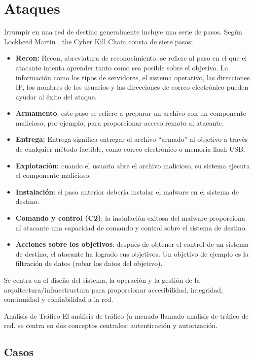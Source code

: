\section{Ataques}

Irrumpir en una red de destino generalmente incluye una serie de pasos. Según Lockheed Martin , the Cyber Kill Chain consta de siete pasos: 
\begin{itemize}
    \item \textbf{Recon:} Recon, abreviatura de reconocimiento, se refiere al paso en el que el atacante intenta aprender tanto como sea posible sobre el objetivo. La información como los tipos de servidores, el sistema operativo, las direcciones IP, los nombres de los usuarios y las direcciones de correo electrónico pueden ayudar al éxito del ataque. 
    \item \textbf{Armamento}: este paso se refiere a preparar un archivo con un componente malicioso, por ejemplo, para proporcionar acceso remoto al atacante. \item \textbf{Entrega:} Entrega significa entregar el archivo ``armado'' al objetivo a través de cualquier método factible, como correo electrónico o memoria flash USB. 
    \item \textbf{Explotación:} cuando el usuario abre el archivo malicioso, su sistema ejecuta el componente malicioso. 
    \item \textbf{Instalación}: el paso anterior debería instalar el malware en el sistema de destino. 
    \item \textbf{Comando y control (C2)}: la instalación exitosa del malware proporciona al atacante una capacidad de comando y control sobre el sistema de destino. 
    \item \textbf{Acciones sobre los objetivos}: después de obtener el control de un sistema de destino, el atacante ha logrado sus objetivos. Un objetivo de ejemplo es la filtración de datos (robar los datos del objetivo).
\end{itemize}

Se centra en el diseño del sistema, la operación y la gestión de la arquitectura/infraestructura para proporcionar accesibilidad, integridad, continuidad y confiabilidad a la red. 

Análisis de Tráfico
El análisis de tráfico (a menudo llamado análisis de tráfico de red. se centra en dos conceptos centrales: autenticación y autorización. 


\subsection{Casos}

